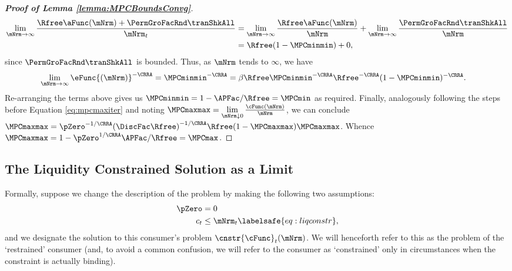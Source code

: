\documentclass[\econtexRoot/BufferStockTheory]{subfiles}
\begin{document}
\begin{proof}[\textbf{Proof of Lemma \ref{lemma:MPCBoundsConvg}}]
\begin{align}
\lim_{\mNrm\rightarrow \infty}\frac{\Rfree \aFunc(\mNrm)+{\PermGroFacRnd}{\tranShkAll}}{\mNrm_{t}} &  = \lim_{\mNrm \rightarrow \infty}\frac{\Rfree \aFunc(\mNrm)}{\mNrm} + \lim_{\mNrm\rightarrow \infty}\frac{{\PermGroFacRnd}{\tranShkAll}}{\mNrm} \\
			& = \Rfree (1- \MPCminmin) + 0, 
\end{align}
since ${\PermGroFacRnd}{\tranShkAll}$ is bounded. Thus, as $\mNrm$ tends to $\infty$, we have
%
\begin{equation}\begin{gathered}\begin{aligned} %
 \lim\limits_{\mNrm\rightarrow \infty}\eFunc{(\mNrm)}^{-\CRRA}  & =  \MPCminmin^{-\CRRA} = \beta\Rfree\MPCminmin^{-\CRRA}\Rfree^{-\CRRA} (1- \MPCminmin) ^{-\CRRA}. 
\end{aligned}\end{gathered}\end{equation}
%
Re-arranging the terms above gives us $\MPCminmin =1-  \APFac/\Rfree =  \MPCmin$ as required. Finally, analogously following the steps before Equation \eqref{eq:mpcmaxiter} and noting $\MPCmaxmax = \lim\limits_{\mNrm\downarrow 0}\frac{\cFunc(\mNrm)}{\mNrm}$, we can conclude $\MPCmaxmax  = \pZero^{-1/\CRRA} {(\DiscFac
\Rfree)}^{-1/\CRRA}\Rfree(1-\MPCmaxmax)\MPCmaxmax$. Whence $\MPCmaxmax = 1- \pZero^{1/\CRRA}\APFac/\Rfree = \MPCmax$. 



%
\end{proof}

\subsection{The Liquidity Constrained Solution as a Limit}\label{sec:LiqConstrAsLimit}

Formally, suppose we change the description of the problem by making
the following two assumptions:
\begin{eqnarray*}
  \pZero   & = 0
  \\  c_{t} & \leq  \mNrm_{t} \labelsafe{eq:liqconstr},
\end{eqnarray*}
and we designate the solution to this consumer's problem $\cnstr{\cFunc}_{t}(\mNrm)$.
We will henceforth refer to this as the problem of the `restrained' consumer (and, to avoid a common confusion, we will refer to the consumer as `constrained' only in circumstances when the constraint is actually binding).
\end{document}
